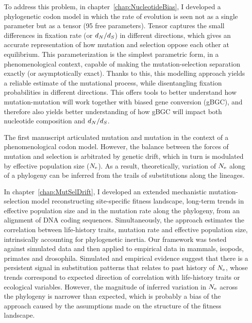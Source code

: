 To address this problem, in chapter~\ref{chap:NucleotideBias}, I developed a phylogenetic codon model in which the rate of evolution is seen not as a single parameter but as a tensor (95 free parameters).
Tensor captures the small differences in fixation rate (or $d_N / d_S$) in different directions, which gives an accurate representation of how mutation and selection oppose each other at equilibrium.
This parameterization is the simplest parametric form, in a phenomenological context, capable of making the mutation-selection separation exactly (or asymptotically exact).
Thanks to this, this modelling approach yields a reliable estimate of the mutational process, while disentangling fixation probabilities in different directions.
This offers tools to better understand how mutation-mutation will work together with biased gene conversion (\acrshort{gBGC}), and therefore also yields better understanding of how \acrshort{gBGC} will impact both nucleotide composition and $d_N / d_S$.

The first manuscript articulated mutation and mutation in the context of a phenomenological codon model.
However, the balance between the forces of mutation and selection is arbitrated by genetic drift, which in turn is modulated by effective population size ($N_{\textrm{e}}$).
As a result, theoretically, variation of $N_{\textrm{e}}$ along of a phylogeny can be inferred from the trails of substitutions along the lineages.

In chapter~\ref{chap:MutSelDrift}, I developed an extended mechanistic mutation-selection model reconstructing site-specific fitness landscape, long-term trends in effective population size and in the mutation rate along the phylogeny, from an alignment of \acrshort{DNA} coding sequences.
Simultaneously, the approach estimates the correlation between life-history traits, mutation rate and effective population size, intrinsically accounting for phylogenetic inertia.
Our framework was tested against simulated data and then applied to empirical data in mammals, isopods, primates and drosophila.
Simulated and empirical evidence suggest that there is a persistent signal in substitution patterns that relates to past history of $N_{\textrm{e}}$, whose trends correspond to expected direction of correlation with life-history traits or ecological variables.
However, the magnitude of inferred variation in $N_{\textrm{e}}$ across the phylogeny is narrower than expected, which is probably a bias of the approach caused by the assumptions made on the structure of the fitness landscape.

